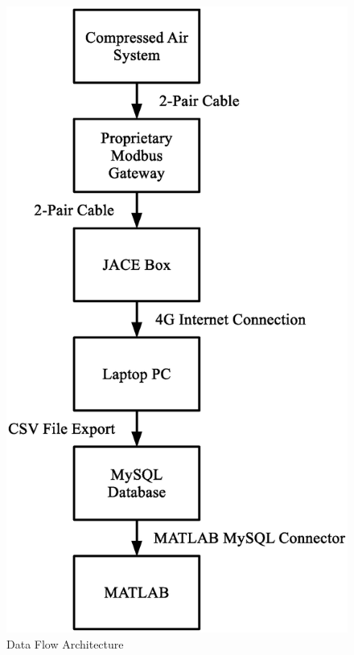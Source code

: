 \begin{figure}
\includegraphics[width = \columnwidth]{./Images/DataFlowArchitecture.eps}
\caption{Data Flow Architecture}
\label{fig:dataflow}
\end{figure}

